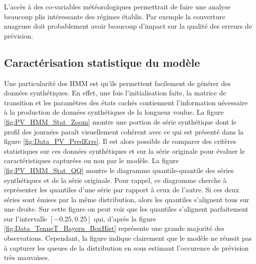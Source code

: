\documentclass[12pt, french]{report}
\begin{document}
L'accès à des co-variables météorologiques permettrait de faire une analyse beaucoup plis intéressante des régimes établis. Par exemple la couverture nuageuse doit probablement avoir beaucoup d'impact sur la qualité des erreurs de prévision. 

\subsection{Caractérisation statistique du modèle}
Une particularité des HMM est qu'ils permettent facilement de générer des données synthétiques. En effet, une fois l'initialisation faite, la matrice de transition et les paramètres des états cachés contiennent l'information nécessaire à la production de données synthétiques de la longueur voulue. La figure \ref{fig:PV_HMM_Stat_Zoom} montre une portion de série synthétique dont le profil des journées paraît visuellement cohérent avec ce qui est présenté dans la figure \ref{fig:Data_PV_PredErrs}. Il est alors possible de comparer des critères statistiques sur ces données synthétiques et sur la série originale pour évaluer le caractéristiques capturées ou non par le modèle. La figure \ref{fig:PV_HMM_Stat_QQ} montre le diagramme quantile-quantile des séries synthétiques et de la série originale. Pour rappel, ce diagramme cherche à représenter les quantiles d'une série par rapport à ceux de l'autre. Si ces deux séries sont émises par la même distribution, alors les quantiles s'alignent tous sur une droite. Sur cette figure on peut voir que les quantiles s'alignent parfaitement sur l'intervalle $[-0.25,0.25]$ qui, d'après la figure \ref{fig:Data_TenneT_Bayern_BoxHist} représente une grande majorité des observations. Cependant, la figure indique clairement que le modèle ne réussit pas à capturer les queues de la distribution en sous estimant l'occurence de prévision très mauvaises.
\end{document}
